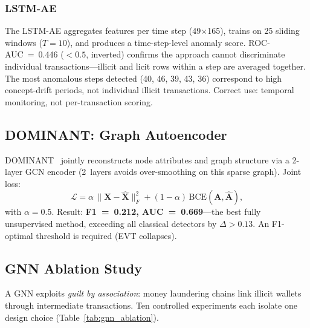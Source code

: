 \documentclass[conference]{IEEEtran}
\begin{document}
\subsubsection{LSTM-AE}
The LSTM-AE aggregates features per time step (49$\times$165), trains on
25 sliding windows ($T{=}10$), and produces a time-step-level anomaly score.
ROC-AUC~=~0.446 ($<0.5$, inverted) confirms the approach cannot discriminate
individual transactions---illicit and licit rows within a step are averaged
together.  The most anomalous steps detected (40, 46, 39, 43, 36) correspond
to high concept-drift periods, not individual illicit transactions.  Correct
use: temporal monitoring, not per-transaction scoring.

\subsection{DOMINANT: Graph Autoencoder}

DOMINANT~\cite{ding2019dominant} jointly reconstructs node attributes and
graph structure via a 2-layer GCN encoder (2~layers avoids over-smoothing
on this sparse graph).  Joint loss:
\begin{equation}
\mathcal{L} = \alpha\,\|\mathbf{X} - \hat{\mathbf{X}}\|_F^2
+ (1-\alpha)\,\text{BCE}(\mathbf{A}, \hat{\mathbf{A}}),
\label{eq:dominant}
\end{equation}
with $\alpha{=}0.5$.  Result: \textbf{F1~=~0.212, AUC~=~0.669}---the best
fully unsupervised method, exceeding all classical detectors by
$\Delta{>}0.13$.  An F1-optimal threshold is required (EVT collapses).

\subsection{GNN Ablation Study}

A GNN exploits \emph{guilt by association}: money laundering chains link
illicit wallets through intermediate transactions.  Ten controlled experiments
each isolate one design choice (Table~\ref{tab:gnn_ablation}).
\end{document}
